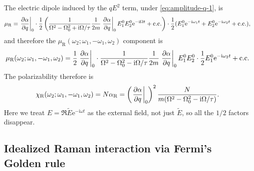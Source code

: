 \documentclass[hyperref, a4paper]{article}
\newcommand*{\ii}{\mathrm{i}}
\newcommand*{\ee}{\mathrm{e}}
\begin{document}
The electric dipole induced by the $qE^2$ term, under \eqref{eq:amplitude-q-1}, is 
\begin{equation}
    \mu_\text{R} = \eval{\pdv{\alpha}{q}}_0 \cdot \frac{1}{2} 
    \left(
        \frac{1}{
            \Omega^2 - \Omega_0^2 + \ii \Omega / \tau 
        } \frac{1}{2m} \eval{\pdv{\alpha}{q}}_0 E_1^0 E_2^0 \ee^{-\ii \Omega t}
        + \text{c.c.} 
    \right)
    \cdot \frac{1}{2} (E_1^0 \ee^{-\ii \omega_1 t} + E_2^0 \ee^{-\ii \omega_2 t} + \text{c.c.}),
\end{equation}
and therefore the $\mu_{\text{R}}(\omega_2; \omega_1, - \omega_1, \omega_2)$ component is 
\begin{equation}
    \mu_{\text{R}}(\omega_2; \omega_1, - \omega_1, \omega_2)
    = \frac{1}{2} \eval{\pdv{\alpha}{q}}_0 \cdot 
    \frac{1}{
        \Omega^2 - \Omega_0^2 - \ii \Omega / \tau 
    } \frac{1}{2m} \eval{\pdv{\alpha}{q}}_0 E_1^0 E_2^0
    \cdot \frac{1}{2} E_1^0 \ee^{- \ii \omega_2 t} + \text{c.c.}
\end{equation}
The polarizability therefore is 
\begin{equation}
    \chi_{\text{R}}(\omega_2; \omega_1, - \omega_1, \omega_2)
    = N \alpha_{\text{R}}
    = \left(\eval{\pdv{\alpha}{q}}_0 \right)^2
    \frac{N}{
        m (\Omega^2 - \Omega_0^2 - \ii \Omega / \tau )
    } .
\end{equation} 
Here we treat $E = \Re \tilde{E} \ee^{- \ii \omega t}$ 
as the external field, not just $\tilde{E}$, 
so all the $1/2$ factors disappear.

\subsection{Idealized Raman interaction via Fermi's Golden rule}
\end{document}
